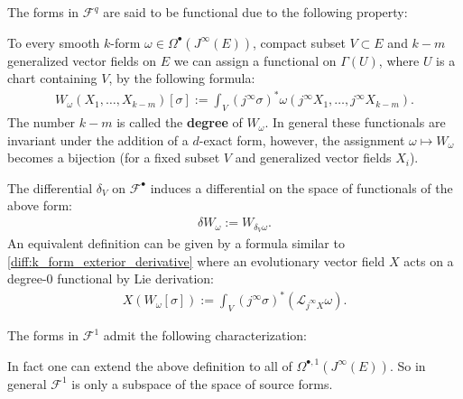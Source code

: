     The forms in $\mathcal{F}^q$ are said to be functional due to the following property:
    \begin{property}[Functionals]
        To every smooth $k$-form $\omega\in\Omega^\bullet(J^\infty(E))$, compact subset $V\subset E$ and $k-m$ generalized vector fields on $E$ we can assign a functional on $\Gamma(U)$, where $U$ is a chart containing $V$, by the following formula:
        \begin{gather}
            \label{var:functionals}
            W_\omega(X_1,\ldots,X_{k-m})[\sigma] := \int_V(j^\infty\sigma)^*\omega(j^\infty X_1,\ldots,j^\infty X_{k-m}).
        \end{gather}
        The number $k-m$ is called the \textbf{degree} of $W_\omega$. In general these functionals are invariant under the addition of a $d$-exact form, however, the assignment $\omega\mapsto W_\omega$ becomes a bijection (for a fixed subset $V$ and generalized vector fields $X_i$).
    \end{property}
    \begin{construct}
        The differential $\delta_V$ on $\mathcal{F}^\bullet$ induces a differential on the space of functionals of the above form:
        \begin{gather}
            \delta W_\omega := W_{\delta_V\omega}.
        \end{gather}
        An equivalent definition can be given by a formula similar to \ref{diff:k_form_exterior_derivative} where an evolutionary vector field $X$ acts on a degree-$0$ functional by Lie derivation:
        \begin{gather}
            X(W_\omega[\sigma]) := \int_V(j^\infty\sigma)^*(\mathcal{L}_{j^\infty X}\omega).
        \end{gather}
    \end{construct}

    The forms in $\mathcal{F}^1$ admit the following characterization:
    \begin{remark*}
        In fact one can extend the above definition to all of $\Omega^{\bullet,1}(J^\infty(E))$. So in general $\mathcal{F}^1$ is only a subspace of the space of source forms.
    \end{remark*}

